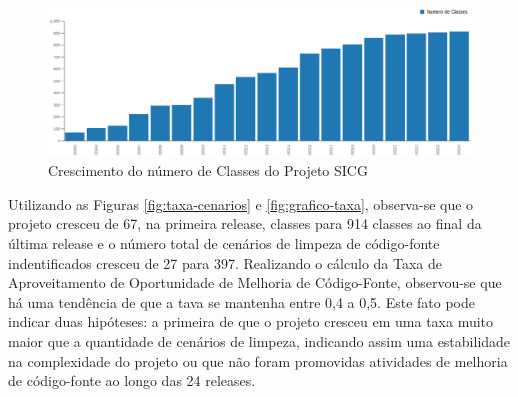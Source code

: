 \begin{figure}[H]
\centering
\includegraphics[keepaspectratio=false,scale=0.48]{figuras/crescimento-projeto.eps}
\caption{Crescimento do número de Classes do Projeto SICG}
\label{fig:crescimento-projeto}
\end{figure}
\FloatBarrier




Utilizando as Figuras \ref{fig:taxa-cenarios} e \ref{fig:grafico-taxa}, observa-se que o projeto cresceu de 67, na primeira release, classes para 914 classes ao final da última release e o número total de cenários de limpeza de código-fonte indentificados cresceu de 27 para 397. Realizando o cálculo da Taxa de Aproveitamento de Oportunidade de Melhoria de Código-Fonte, observou-se que há uma tendência de que a tava se mantenha entre 0,4 a 0,5. Este fato pode indicar duas hipóteses: a primeira de que o projeto cresceu em uma taxa muito maior que a quantidade de cenários de limpeza, indicando assim uma estabilidade na complexidade do projeto ou que não foram promovidas atividades de melhoria de código-fonte ao longo das 24 releases.  

